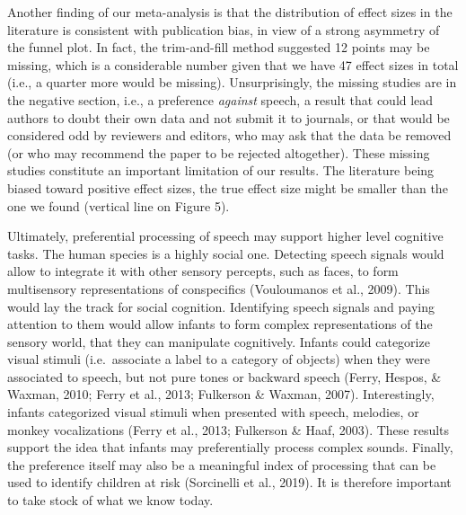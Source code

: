 \documentclass[man,floatsintext]{apa6}
\begin{document}
Another finding of our meta-analysis is that the distribution of effect sizes in the literature is consistent with publication bias, in view of a strong asymmetry of the funnel plot. In fact, the trim-and-fill method suggested 12 points may be missing, which is a considerable number given that we have 47 effect sizes in total (i.e., a quarter more would be missing). Unsurprisingly, the missing studies are in the negative section, i.e., a preference \emph{against} speech, a result that could lead authors to doubt their own data and not submit it to journals, or that would be considered odd by reviewers and editors, who may ask that the data be removed (or who may recommend the paper to be rejected altogether). These missing studies constitute an important limitation of our results. The literature being biased toward positive effect sizes, the true effect size might be smaller than the one we found (vertical line on Figure 5).

Ultimately, preferential processing of speech may support higher level cognitive tasks. The human species is a highly social one. Detecting speech signals would allow to integrate it with other sensory percepts, such as faces, to form multisensory representations of conspecifics (Vouloumanos et al., 2009). This would lay the track for social cognition. Identifying speech signals and paying attention to them would allow infants to form complex representations of the sensory world, that they can manipulate cognitively. Infants could categorize visual stimuli (i.e.~associate a label to a category of objects) when they were associated to speech, but not pure tones or backward speech (Ferry, Hespos, \& Waxman, 2010; Ferry et al., 2013; Fulkerson \& Waxman, 2007). Interestingly, infants categorized visual stimuli when presented with speech, melodies, or monkey vocalizations (Ferry et al., 2013; Fulkerson \& Haaf, 2003). These results support the idea that infants may preferentially process complex sounds. Finally, the preference itself may also be a meaningful index of processing that can be used to identify children at risk (Sorcinelli et al., 2019). It is therefore important to take stock of what we know today.
\end{document}
